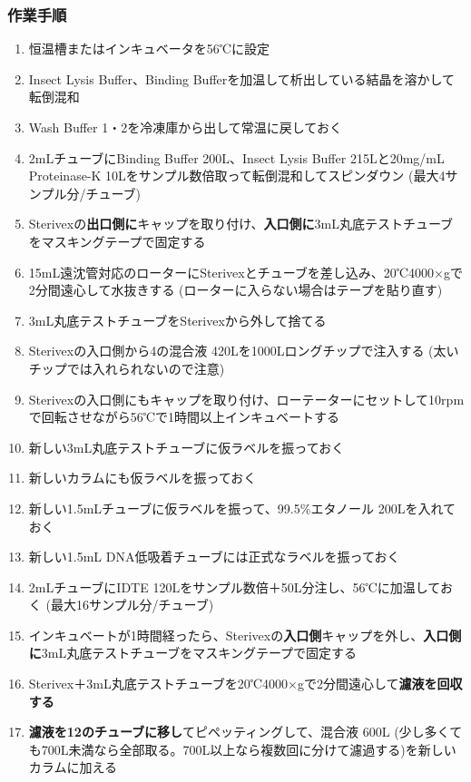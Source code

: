 \documentclass[titlepage,10pt,a4paper,uplatex]{jsbook}
\renewcommand{\textbf}[1]{{\bfseries\sffamily#1}}
\begin{document}
\subsubsection{作業手順}
\begin{enumerate}
\item 恒温槽またはインキュベータを56℃に設定
\item Insect Lysis Buffer、Binding Bufferを加温して析出している結晶を溶かして転倒混和
\item Wash Buffer 1・2を冷凍庫から出して常温に戻しておく
\item 2mLチューブにBinding Buffer 200{\textmu}L、Insect Lysis Buffer 215{\textmu}Lと20mg/mL Proteinase-K 10{\textmu}Lをサンプル数倍取って転倒混和してスピンダウン (最大4サンプル分/チューブ)
\item Sterivexの\textbf{出口側に}キャップを取り付け、\textbf{入口側に}3mL丸底テストチューブをマスキングテープで固定する
\item 15mL遠沈管対応のローターにSterivexとチューブを差し込み、20℃4000×gで2分間遠心して水抜きする (ローターに入らない場合はテープを貼り直す)
\item 3mL丸底テストチューブをSterivexから外して捨てる
\item Sterivexの入口側から4の混合液 420{\textmu}Lを1000{\textmu}Lロングチップで注入する (太いチップでは入れられないので注意)
\item Sterivexの入口側にもキャップを取り付け、ローテーターにセットして10rpmで回転させながら56℃で1時間以上インキュベートする
\item 新しい3mL丸底テストチューブに仮ラベルを振っておく
\item 新しいカラムにも仮ラベルを振っておく
\item 新しい1.5mLチューブに仮ラベルを振って、99.5\%エタノール 200{\textmu}Lを入れておく
\item 新しい1.5mL DNA低吸着チューブには正式なラベルを振っておく
\item 2mLチューブにIDTE 120{\textmu}Lをサンプル数倍＋50{\textmu}L分注し、56℃に加温しておく (最大16サンプル分/チューブ)
\item インキュベートが1時間経ったら、Sterivexの\textbf{入口側}キャップを外し、\textbf{入口側に}3mL丸底テストチューブをマスキングテープで固定する
\item Sterivex＋3mL丸底テストチューブを20℃4000×gで2分間遠心して\textbf{濾液を回収する}
\item \textbf{濾液を12のチューブに移し}てピペッティングして、混合液 600{\textmu}L (少し多くても700{\textmu}L未満なら全部取る。700{\textmu}L以上なら複数回に分けて濾過する)を新しいカラムに加える

\end{enumerate}
\end{document}
